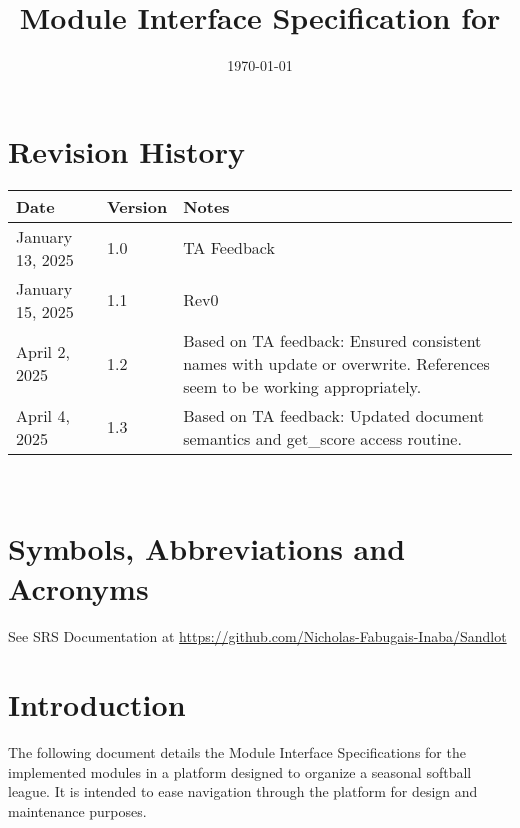 \documentclass[12pt, titlepage]{article}
\begin{document}
\title{Module Interface Specification for \progname{}}

\author{\authname}

\date{\today}

\maketitle


\section{Revision History}

\begin{tabularx}{\textwidth}{p{3cm}p{2cm}X}
\toprule {\bf Date} & {\bf Version} & {\bf Notes}\\
\midrule
January 13, 2025 & 1.0 & TA Feedback\\
January 15, 2025 & 1.1 & Rev0\\
April 2, 2025 & 1.2 & Based on TA feedback: Ensured consistent names with
update or overwrite. References seem to be working appropriately.\\
April 4, 2025 & 1.3 & Based on TA feedback: Updated document semantics and
get\_score access routine.\\
\bottomrule
\end{tabularx}

~\newpage

\section{Symbols, Abbreviations and Acronyms}

See SRS Documentation at \url{https://github.com/Nicholas-Fabugais-Inaba/Sandlot}

\newpage

\tableofcontents

\newpage


\section{Introduction}

The following document details the Module Interface Specifications for
the implemented modules in a platform designed to organize a seasonal
softball league. It is intended to ease navigation through the platform
for design and maintenance purposes.
\end{document}
